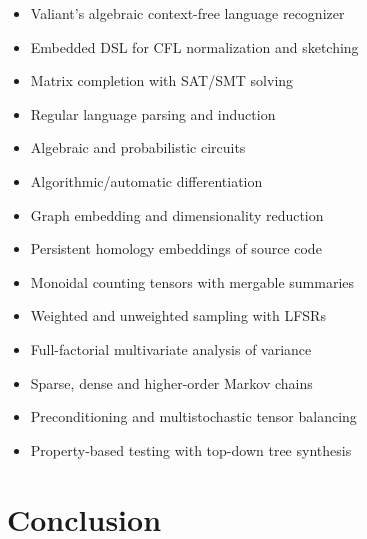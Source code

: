 \documentclass[sigplan,10pt,review,anonymous]{acmart}
\begin{document}
\begin{itemize}
  \item Valiant's algebraic context-free language recognizer
  \item Embedded DSL for CFL normalization and sketching
  \item Matrix completion with SAT/SMT solving
  \item Regular language parsing and induction
  \item Algebraic and probabilistic circuits
  \item Algorithmic/automatic differentiation
  \item Graph embedding and dimensionality reduction
  \item Persistent homology embeddings of source code
  \item Monoidal counting tensors with mergable summaries
  \item Weighted and unweighted sampling with LFSRs
  \item Full-factorial multivariate analysis of variance
  \item Sparse, dense and higher-order Markov chains
  \item Preconditioning and multistochastic tensor balancing
  \item Property-based testing with top-down tree synthesis
\end{itemize}

\section{Conclusion}



\end{document}
